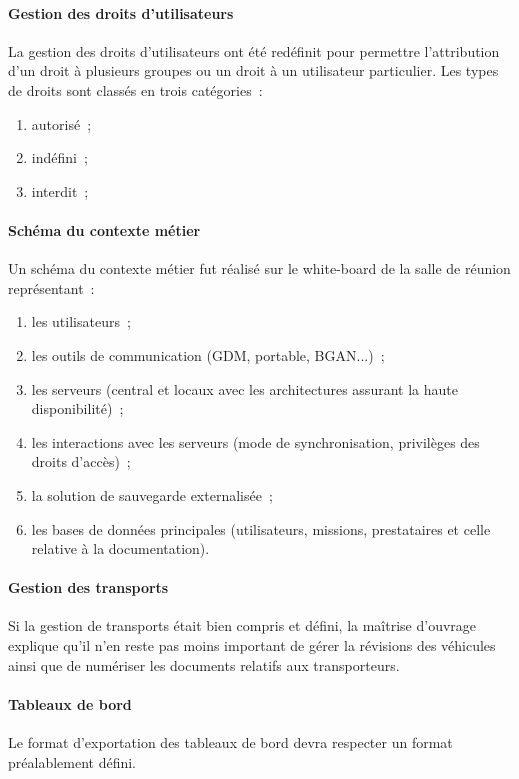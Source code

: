 \documentclass[11pt,fleqn]{report}
\begin{document}
\paragraph{Gestion des droits d'utilisateurs}
La gestion des droits d'utilisateurs ont été redéfinit pour permettre l'attribution d'un droit à plusieurs groupes ou un droit à un utilisateur particulier. Les types de droits sont classés en trois catégories~:
\begin{enumerate}
	\item autorisé~;
	\item indéfini~;
	\item interdit~;
\end{enumerate}

\paragraph{Schéma du contexte métier}
Un schéma du contexte métier fut réalisé sur le white-board de la salle de réunion représentant~:
\begin{enumerate}
	\item les utilisateurs~;
	\item les outils de communication (GDM, portable, BGAN...)~;
	\item les serveurs (central et locaux avec les architectures assurant la haute disponibilité)~;
	\item les interactions avec les serveurs (mode de synchronisation, privilèges des droits d'accès)~;
	\item la solution de sauvegarde externalisée~;
	\item les bases de données principales (utilisateurs, missions, prestataires et celle relative à la documentation).
\end{enumerate}

\paragraph{Gestion des transports}
Si la gestion de transports était bien compris et défini, la maîtrise d'ouvrage explique qu'il n'en reste pas moins important de gérer la révisions des véhicules ainsi que de numériser les documents relatifs aux transporteurs.

\paragraph{Tableaux de bord}
Le format d'exportation des tableaux de bord devra respecter un format préalablement défini.
\end{document}
